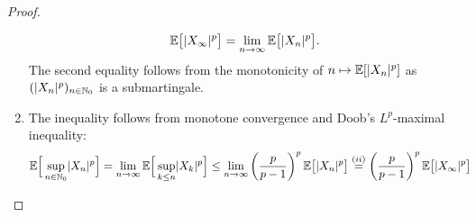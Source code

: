 \begin{proof}[Proof]
\begin{enumerate}[label=(\roman*)]
	\begin{align*}
		\mathbb{E}\big[\lvert X_{\infty}\rvert^p\big] = \lim_{n\to\infty} \mathbb{E}\big[\lvert X_n \rvert^p\big].
	\end{align*}
	The second equality follows from the monotonicity of $n\mapsto \mathbb{E}[|X_n|^p]$ as $(|X_n|^p)_{n\in \mathbb{N}_0}$ is a submartingale.
	\item
	The inequality follows from monotone convergence and Doob's $L^p$-maximal inequality:
	\begin{align*}
		\mathbb{E}\Big[ \sup\limits_{n\in\mathbb{N}_0} \lvert X_n \rvert^p \Big]
		&= \lim_{n\to\infty} \mathbb{E} \Big[ \sup\limits_{k\leq n} \lvert X_k \rvert^p \Big] 
		\leq \lim_{n\to\infty} \left( \frac{p}{p-1} \right)^p \mathbb{E}\big[\lvert X_n \rvert^p\big]
		\overset{(ii)}{=} \left( \frac{p}{p-1} \right)^p \mathbb{E}\big[\lvert X_{\infty} \rvert^p\big]
	\end{align*}
	\end{enumerate}
\end{proof}

